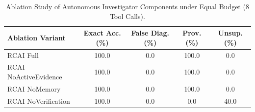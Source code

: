 \begin{table}[t]
\centering
\small
\caption{Ablation Study of Autonomous Investigator Components under Equal Budget (8 Tool Calls).}
\label{tab:ablation_results}
\begin{tabular}{lcccc}
\toprule
\textbf{Ablation Variant} & \textbf{Exact Acc. (\%)} & \textbf{False Diag. (\%)} & \textbf{Prov. (\%)} & \textbf{Unsup. (\%)} \\
\midrule
RCAI Full & 100.0 & 0.0 & 100.0 & 0.0 \\
RCAI NoActiveEvidence & 100.0 & 0.0 & 100.0 & 0.0 \\
RCAI NoMemory & 100.0 & 0.0 & 100.0 & 0.0 \\
RCAI NoVerification & 100.0 & 0.0 & 0.0 & 40.0 \\
\bottomrule
\end{tabular}
\end{table}
